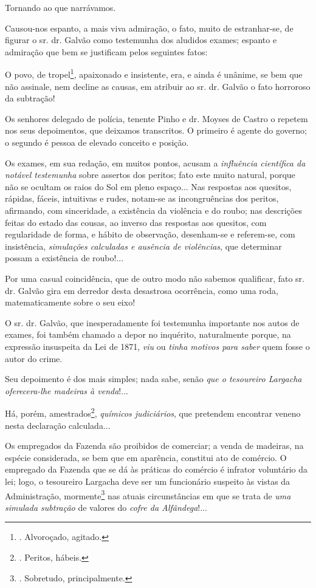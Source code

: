 Tornando ao que narrávamos.

Causou-nos espanto, a mais viva admiração, o fato, muito de
estranhar-se, de figurar o sr. dr. Galvão como testemunha dos aludidos
exames; espanto e admiração que bem se justificam pelos seguintes fatos:

O povo, de tropel\footnote{. Alvoroçado, agitado.}, apaixonado e
insistente, era, e ainda é unânime, se bem que não assinale, nem decline
as causas, em atribuir ao sr. dr. Galvão o fato horroroso da subtração!

Os senhores delegado de polícia, tenente Pinho e dr. Moyses de Castro o
repetem nos seus depoimentos, que deixamos transcritos. O primeiro é
agente do governo; o segundo é pessoa de elevado conceito e posição.

Os exames, em sua redação, em muitos pontos, acusam a \emph{influência
científica da notável testemunha} sobre assertos dos peritos; fato este
muito natural, porque não se ocultam os raios do Sol em pleno espaço...
Nas respostas aos quesitos, rápidas, fáceis, intuitivas e rudes,
notam-se as incongruências dos peritos, afirmando, com sinceridade, a
existência da violência e do roubo; nas descrições feitas do estado das
cousas, ao inverso das respostas aos quesitos, com regularidade de
forma, e hábito de observação, desenham-se e referem-se, com
insistência, \emph{simulações calculadas e ausência de violências}, que
determinar possam a existência de roubo!...

Por uma casual coincidência, que de outro modo não sabemos qualificar,
fato sr. dr. Galvão gira em derredor desta desastrosa ocorrência, como
uma roda, matematicamente sobre o seu eixo!

O sr. dr. Galvão, que inesperadamente foi testemunha importante nos
autos de exames, foi também chamado a depor no inquérito, naturalmente
porque, na expressão insuspeita da Lei de 1871, \emph{viu} ou
\emph{tinha motivos para saber} quem fosse o autor do crime.

Seu depoimento é dos mais simples; nada sabe, senão \emph{que o
tesoureiro Largacha oferecera-lhe madeiras à venda}!...

Há, porém, amestrados\footnote{. Peritos, hábeis.}, \emph{químicos
judiciários}, que pretendem encontrar veneno nesta declaração
calculada...

Os empregados da Fazenda são proibidos de comerciar; a venda de
madeiras, na espécie considerada, se bem que em aparência, constitui ato
de comércio. O empregado da Fazenda que se dá às práticas do comércio é
infrator voluntário da lei; logo, o tesoureiro Largacha deve ser um
funcionário suspeito às vistas da Administração, mormente\footnote{.
  Sobretudo, principalmente.} nas atuais circunstâncias em que se trata
de \emph{uma simulada subtração} de valores do \emph{cofre da
Alfândega}!...

